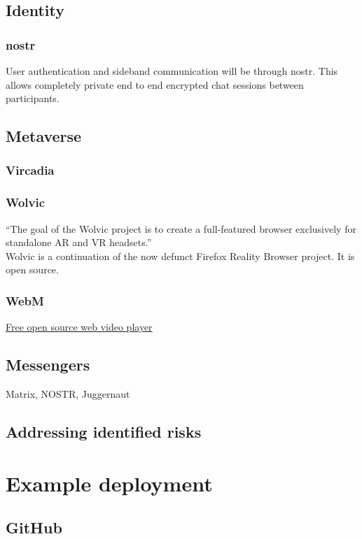 



\lipsum[50]
\section{Identity}
\subsection{nostr}
User authentication and sideband communication will be through nostr. This allows completely private end to end encrypted chat sessions between participants.
\section{Metaverse}
\lipsum[50]
\subsection{Vircadia}
\lipsum[50]
\subsection{Wolvic}
``The goal of the Wolvic project is to create a full-featured browser exclusively for standalone AR and VR headsets.''\\
Wolvic is a continuation of the now defunct Firefox Reality Browser project. It is open source.
\subsection{WebM}
\href{https://www.webmproject.org/about/}{Free open source web video player}	
\lipsum[50]
\section{Messengers}
Matrix, NOSTR, Juggernaut
\section{Addressing identified risks}
\chapter{Example deployment }
\lipsum[50]
\section{GitHub }
\lipsum[50]